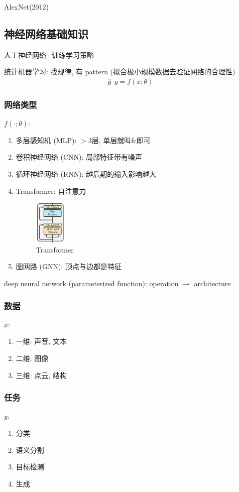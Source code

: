 AlexNet(2012)

\subsection{神经网络基础知识}
人工神经网络+训练学习策略

统计机器学习: 找规律, 有 pattern (拟合极小规模数据去验证网络的合理性)
\begin{align*}
    \hat{y}\ \ y=f(x;\theta)
\end{align*}

\subsubsection{网络类型}
$f(\cdot; \theta)$:
\begin{enumerate}
    \item 多层感知机 (MLP): $>3$层, 单层就叫fc即可
    \item 卷积神经网络 (CNN): 局部特征带有噪声
    \item 循环神经网络 (RNN): 越后期的输入影响越大
    \item Transformer: 自注意力 
    \begin{figure}[!htb]
        \centering
        \includegraphics[width=0.14\textwidth]{pic/DL1/Transformer.png}
        \caption{Transformer}
    \end{figure}
    
    \item 图网路 (GNN): 顶点与边都是特征
\end{enumerate}

deep neural network (parameterized function): operation $\rightarrow$ architecture

\subsubsection{数据}
$x$:
\begin{enumerate}
    \item 一维: 声音, 文本
    \item 二维: 图像
    \item 三维: 点云, 结构
\end{enumerate}

\subsubsection{任务}
$y$:
\begin{enumerate}
    \item 分类
    \item 语义分割
    \item 目标检测
    \item 生成
\end{enumerate}

